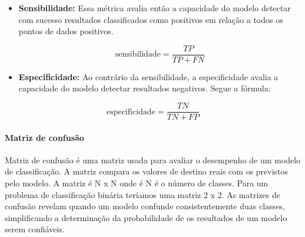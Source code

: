 \documentclass[
  letterpaper,
  DIV=11,
  numbers=noendperiod]{scrreprt}
\let\oldparagraph\paragraph
\renewcommand{\paragraph}[1]{\oldparagraph{#1}\mbox{}}
\begin{document}
\begin{itemize}
\item
  \textbf{Sensibilidade:} Essa métrica avalia então a capacidade do
  modelo detectar com sucesso resultados classificados como positivos em
  relação a todos os pontos de dados positivos.

  \[
  \mbox{sensibilidade} = \frac{TP}{TP + FN}
  \]
\item
  \textbf{Especificidade:} Ao contrário da sensibilidade, a
  especificidade avalia a capacidade do modelo detectar resultados
  negativos. Segue a fórmula:
\end{itemize}

\[
\mbox{especificidade} = \frac{TN}{TN + FP}
\]

\hypertarget{matriz-de-confusuxe3o}{%
\paragraph{Matriz de confusão}\label{matriz-de-confusuxe3o}}

Matriz de confusão é uma matriz usada para avaliar o desempenho de um
modelo de classificação. A matriz compara os valores de destino reais
com os previstos pelo modelo. A matriz é N x N onde é N é o número de
classes. Para um problema de classificação binária teríamos uma matriz 2
x 2. As matrizes de confusão revelam quando um modelo confunde
consistentemente duas classes, simplificando a determinação da
probabilidade de os resultados de um modelo serem confiáveis.
\end{document}
